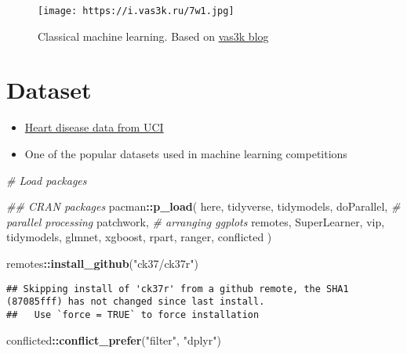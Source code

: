 \documentclass[
]{book}
\newenvironment{Shaded}{\begin{snugshade}}{\end{snugshade}}
\newcommand{\CommentTok}[1]{\textcolor[rgb]{0.56,0.35,0.01}{\textit{#1}}}
\newcommand{\KeywordTok}[1]{\textcolor[rgb]{0.13,0.29,0.53}{\textbf{#1}}}
\newcommand{\NormalTok}[1]{#1}
\newcommand{\OperatorTok}[1]{\textcolor[rgb]{0.81,0.36,0.00}{\textbf{#1}}}
\newcommand{\StringTok}[1]{\textcolor[rgb]{0.31,0.60,0.02}{#1}}
\begin{document}
\begin{figure}
\centering
\texttt{[image: https://i.vas3k.ru/7w1.jpg]}
\caption{Classical machine learning. Based on \href{https://vas3k.com/blog/machine_learning/}{vas3k blog}}
\end{figure}

\hypertarget{dataset}{%
\section{Dataset}\label{dataset}}

\begin{itemize}
\item
  \href{https://archive.ics.uci.edu/ml/datasets/heart+Disease}{Heart disease data from UCI}
\item
  One of the popular datasets used in machine learning competitions
\end{itemize}

\begin{Shaded}
\begin{Highlighting}[]
\CommentTok{\# Load packages}

\CommentTok{\#\# CRAN packages}
\NormalTok{pacman}\OperatorTok{::}\KeywordTok{p\_load}\NormalTok{(}
\NormalTok{  here,}
\NormalTok{  tidyverse,}
\NormalTok{  tidymodels,}
\NormalTok{  doParallel, }\CommentTok{\# parallel processing}
\NormalTok{  patchwork, }\CommentTok{\# arranging ggplots}
\NormalTok{  remotes,}
\NormalTok{  SuperLearner,}
\NormalTok{  vip,}
\NormalTok{  tidymodels,}
\NormalTok{  glmnet,}
\NormalTok{  xgboost,}
\NormalTok{  rpart,}
\NormalTok{  ranger,}
\NormalTok{  conflicted}
\NormalTok{)}

\NormalTok{remotes}\OperatorTok{::}\KeywordTok{install\_github}\NormalTok{(}\StringTok{"ck37/ck37r"}\NormalTok{)}
\end{Highlighting}
\end{Shaded}

\begin{verbatim}
## Skipping install of 'ck37r' from a github remote, the SHA1 (87085fff) has not changed since last install.
##   Use `force = TRUE` to force installation
\end{verbatim}

\begin{Shaded}
\begin{Highlighting}[]
\NormalTok{conflicted}\OperatorTok{::}\KeywordTok{conflict\_prefer}\NormalTok{(}\StringTok{"filter"}\NormalTok{, }\StringTok{"dplyr"}\NormalTok{)}
\end{Highlighting}
\end{Shaded}
\end{document}
